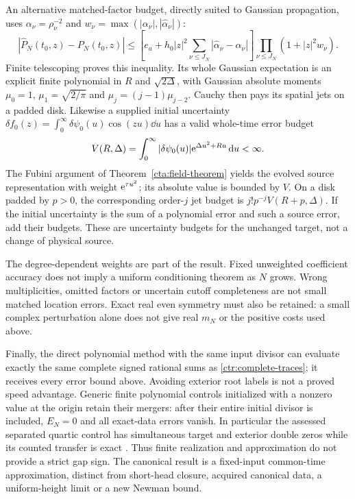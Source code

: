 An alternative matched-factor budget, directly suited to Gaussian
propagation, uses $\alpha_\nu=\rho_\nu^{-2}$ and
$w_\nu=\max(|\alpha_\nu|,|\widehat\alpha_\nu|)$:
\begin{equation}
 |\widehat P_N(t_0,z)-P_N(t_0,z)|
 \le\left[e_a+h_0|z|^2\sum_{\nu\le J_N}
                  |\widehat\alpha_\nu-\alpha_\nu|\right]
                    \prod_{\nu\le J_N}(1+|z|^2w_\nu).
 \label{ctr:factor-data-error}
\end{equation}
Finite telescoping proves this inequality. Its whole Gaussian expectation
is an explicit finite polynomial in $R$ and $\sqrt{2\Delta}$, with
Gaussian absolute moments $\mu_0=1$, $\mu_1=\sqrt{2/\pi}$ and
$\mu_j=(j-1)\mu_{j-2}$. Cauchy then pays its spatial jets on a padded
disk. Likewise a supplied initial uncertainty
$\delta f_0(z)=\int_0^\infty\delta\psi_0(u)\cos(zu)\dd u$
has a valid whole-time error budget
\begin{equation}
 V(R,\Delta)=\int_0^\infty|\delta\psi_0(u)|
                          \mathrm e^{\Delta u^2+Ru}\,\mathrm d u<\infty.
 \label{ctr:weighted-source-error}
\end{equation}
The Fubini argument of Theorem~\ref{cta:field-theorem} yields the
evolved source representation with weight $\mathrm e^{\tau u^2}$; its
absolute value is bounded by $V$. On a disk padded by $p>0$, the
corresponding order-$j$ jet budget is
$j!p^{-j}V(R+p,\Delta)$. If the initial uncertainty is the sum of a
polynomial error and such a source error, add their budgets. These are
uncertainty budgets for the unchanged target, not a change of physical source.

The degree-dependent weights are part of the result. Fixed unweighted
coefficient accuracy does not imply a uniform conditioning theorem as
$N$ grows. Wrong multiplicities, omitted factors or uncertain cutoff
completeness are not small matched location errors. Exact real even
symmetry must also be retained: a small complex perturbation alone does
not give real $m_N$ or the positive costs used above.

Finally, the direct polynomial method with the same input divisor can
evaluate exactly the same complete signed rational sums as
\eqref{ctr:complete-traces}; it receives every error bound above.
Avoiding exterior root labels is not a proved speed advantage. Generic
finite polynomial controls initialized with a nonzero value at the
origin retain their mergers: after their entire initial divisor is
included, $E_N=0$ and all exact-data errors vanish.
In particular the assessed separated quartic control has simultaneous
target and exterior double zeros while its counted transfer is exact
\cite{BakerCMReview40}. Thus finite realization and approximation do
not provide a strict gap sign. The canonical result is a fixed-input
common-time approximation, distinct from short-head closure, acquired
canonical data, a uniform-height limit or a new Newman bound.
